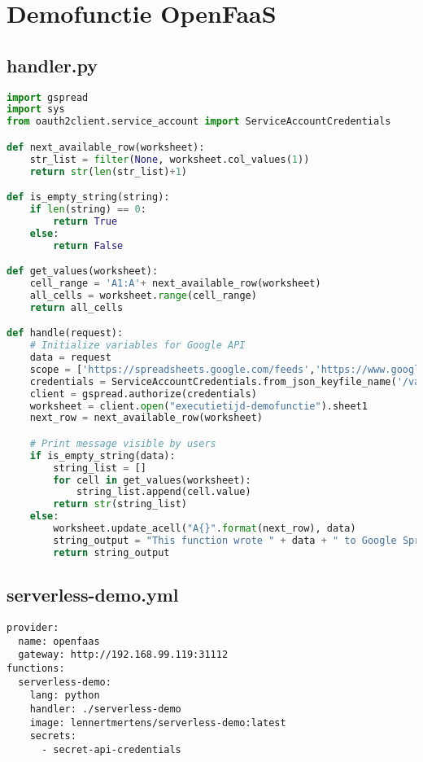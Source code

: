 \newpage
\section{Demofunctie OpenFaaS}
\subsection{handler.py}
\label{sec:demofunctie-openfaas}
\begin{lstlisting}[language=python]
import gspread
import sys
from oauth2client.service_account import ServiceAccountCredentials

def next_available_row(worksheet):
    str_list = filter(None, worksheet.col_values(1))
    return str(len(str_list)+1)

def is_empty_string(string):
    if len(string) == 0:
        return True
    else:
        return False

def get_values(worksheet):
    cell_range = 'A1:A'+ next_available_row(worksheet)
    all_cells = worksheet.range(cell_range)
    return all_cells

def handle(request):   
    # Initialize variables for Google API
    data = request
    scope = ['https://spreadsheets.google.com/feeds','https://www.googleapis.com/auth/drive']
    credentials = ServiceAccountCredentials.from_json_keyfile_name('/var/openfaas/secrets/secret-api-credentials', scope)
    client = gspread.authorize(credentials)
    worksheet = client.open("executietijd-demofunctie").sheet1
    next_row = next_available_row(worksheet)

    # Print message visible by users
    if is_empty_string(data):
        string_list = []
        for cell in get_values(worksheet):
            string_list.append(cell.value)
        return str(string_list)
    else:
        worksheet.update_acell("A{}".format(next_row), data)
        string_output = "This function wrote " + data + " to Google Spreadsheets!"
        return string_output
\end{lstlisting}

\newpage
\subsection{serverless-demo.yml}
\label{sec:serverless-demo.yml}
\begin{lstlisting}
provider:
  name: openfaas
  gateway: http://192.168.99.119:31112
functions:
  serverless-demo:
    lang: python
    handler: ./serverless-demo
    image: lennertmertens/serverless-demo:latest
    secrets:
      - secret-api-credentials
\end{lstlisting}

